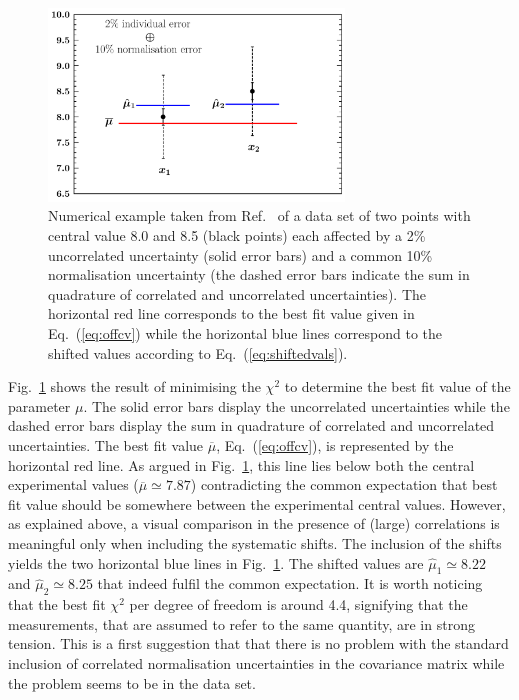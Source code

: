 \documentclass[10pt,a4paper]{article}
\begin{document}
\begin{figure}[h]
  \begin{centering}
    \includegraphics[width=0.7\textwidth]{plots/DAgostiniExample.pdf}
    \caption{Numerical example taken from
      Ref.~\cite{DAgostini:1993arp} of a data set of two points with
      central value 8.0 and 8.5 (black points) each affected by a 2\%
      uncorrelated uncertainty (solid error bars) and a common 10\%
      normalisation uncertainty (the dashed error bars indicate the
      sum in quadrature of correlated and uncorrelated
      uncertainties). The horizontal red line corresponds to the best
      fit value given in Eq.~(\ref{eq:offcv}) while the horizontal
      blue lines correspond to the shifted values according to
      Eq.~(\ref{eq:shiftedvals}).\label{fig:DAgostiniExample}}
  \end{centering}
\end{figure}
Fig.~\ref{fig:DAgostiniExample} shows the result of minimising the
$\chi^2$ to determine the best fit value of the parameter $\mu$. The
solid error bars display the uncorrelated uncertainties while the
dashed error bars display the sum in quadrature of correlated and
uncorrelated uncertainties. The best fit value $\overline{\mu}$,
Eq.~(\ref{eq:offcv}), is represented by the horizontal red line. As
argued in Fig.~\ref{fig:DAgostiniExample}, this line lies below both
the central experimental values ($\overline{\mu}\simeq 7.87$)
contradicting the common expectation that best fit value should be
somewhere between the experimental central values. However, as
explained above, a visual comparison in the presence of (large)
correlations is meaningful only when including the systematic
shifts. The inclusion of the shifts yields the two horizontal blue
lines in Fig.~\ref{fig:DAgostiniExample}. The shifted values are
$\hat{\mu}_1 \simeq 8.22$ and $\hat{\mu}_2 \simeq 8.25$ that indeed
fulfil the common expectation. It is worth noticing that the best fit
$\chi^2$ per degree of freedom is around 4.4, signifying that the
measurements, that are assumed to refer to the same quantity, are in
strong tension. This is a first suggestion that that there is no
problem with the standard inclusion of correlated normalisation
uncertainties in the covariance matrix while the problem seems to be
in the data set.
\end{document}
